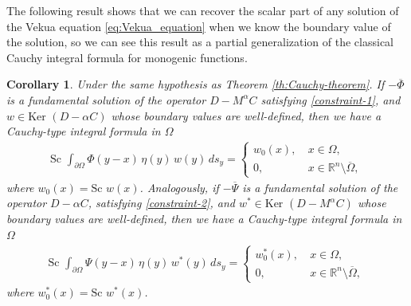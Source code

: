 \documentclass[12pt]{article}
\newcommand{\comment}[1]{\marginpar{\hfuzz=5ex
\scriptsize$\stackrel{?}{\longleftarrow}$\\\hspace*{-3ex}
{\fbox{\parbox{20ex}{\hfuzz=15ex \raggedright\sf#1 }}} }}
\newtheorem{corollary}[theorem]{Corollary}
\def\R{\mathbb{R}}
\begin{document}
The following result shows that we can recover the scalar part of any solution of the Vekua equation \eqref{eq:Vekua_equation} when we know the boundary value of the solution, so we can see this result as a partial generalization of the classical Cauchy integral formula for monogenic functions.   
\begin{corollary}\label{cor:Cauchy}
Under the same hypothesis as Theorem \ref{th:Cauchy-theorem}. If $-\overline{\Phi}$ is a fundamental solution of the operator $D-M^{\alpha}C$ satisfying \eqref{constraint-1}, and $w\in\text{Ker }(D-\alpha C)$ whose boundary values are well-defined, then we have a Cauchy-type integral formula in $\Omega$
\begin{align}\label{eq:scalar-Vekua}
  \text{Sc }\int_{\partial\Omega} \Phi(y-x)\, \eta(y) \, w(y) \,ds_{y}=\left\{
   \begin{array}{ll}
      w_0(x), \ & x\in \Omega,\\
      0,           & x\in \R^n\setminus \overline{\Omega},
   \end{array}
\right.
\end{align}
where $w_0(x)=\text{Sc }w(x)$. Analogously,  if $-\overline{\Psi}$ is a fundamental solution of the operator $D-\alpha C$, satisfying \eqref{constraint-2}, and $w^*\in \text{Ker }(D-M^{\alpha}C)$ whose boundary values are well-defined, then we have a Cauchy-type integral formula in $\Omega$
\begin{align}\label{eq:scalar-adjoint}
  \text{Sc }\int_{\partial\Omega} \Psi(y-x)\, \eta(y) \, w^*(y) \,ds_{y}=\left\{
   \begin{array}{ll}
      w_0^*(x), \ & x\in \Omega,\\
      0,           & x\in \R^n\setminus \overline{\Omega},
   \end{array}
\right.
\end{align}
where $w_0^*(x)=\text{Sc }w^{*}(x)$.
\end{corollary}
\end{document}

